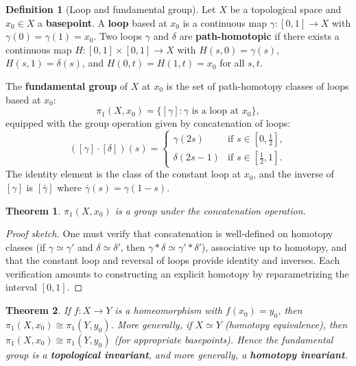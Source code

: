 \documentclass[11pt,a4paper,twoside]{book}
\newtheorem{theorem}{Theorem}[section]
\theoremstyle{remark}
\theoremstyle{definition}
\theoremstyle{definition}
\newtheorem{definition}{Definition}[section]
\begin{document}
\begin{definition}[Loop and fundamental group]
\label{def:fundamental-group}
Let $X$ be a topological space and $x_0\in X$ a \textbf{basepoint}.
A \textbf{loop} based at $x_0$ is a continuous map
$\gamma\colon[0,1]\to X$ with $\gamma(0)=\gamma(1)=x_0$.  Two loops
$\gamma$ and $\delta$ are \textbf{path-homotopic}
if there exists a continuous map $H\colon[0,1]\times[0,1]\to X$ with
$H(s,0)=\gamma(s)$, $H(s,1)=\delta(s)$, and $H(0,t)=H(1,t)=x_0$
for all $s,t$.

The \textbf{fundamental group} of
$X$ at $x_0$ is the set of path-homotopy classes of loops based at
$x_0$:
\[
  \pi_1(X,x_0) = \{[\gamma] : \gamma\text{ is a loop at }x_0\},
\]
equipped with the group operation given by concatenation of loops:
\[
  ([\gamma]\cdot[\delta])(s) = \begin{cases}
    \gamma(2s)   & \text{if }s\in[0,\tfrac{1}{2}],\\
    \delta(2s-1) & \text{if }s\in[\tfrac{1}{2},1].
  \end{cases}
\]
The identity element is the class of the constant loop at $x_0$, and
the inverse of $[\gamma]$ is $[\bar{\gamma}]$ where
$\bar{\gamma}(s)=\gamma(1-s)$.
\end{definition}

\begin{theorem}
\label{thm:pi1-well-defined}
$\pi_1(X,x_0)$ is a group under the concatenation operation.
\end{theorem}

\begin{proof}[Proof sketch]
One must verify that concatenation is well-defined on homotopy classes
(if $\gamma\simeq\gamma'$ and $\delta\simeq\delta'$, then
$\gamma*\delta\simeq\gamma'*\delta'$), associative up to homotopy,
and that the constant loop and reversal of loops provide identity and
inverses.  Each verification amounts to constructing an explicit
homotopy by reparametrizing the interval $[0,1]$.
\end{proof}

\begin{theorem}
\label{thm:pi1-topological-invariant}
If $f\colon X\to Y$ is a homeomorphism with $f(x_0)=y_0$, then
$\pi_1(X,x_0)\cong\pi_1(Y,y_0)$.  More generally, if $X\simeq Y$
(homotopy equivalence), then $\pi_1(X,x_0)\cong\pi_1(Y,y_0)$ (for
appropriate basepoints).  Hence the fundamental group is a
\textbf{topological invariant}, and more generally, a \textbf{homotopy
invariant}.
\end{theorem}
\end{document}

